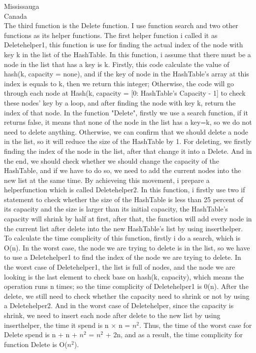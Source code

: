 \documentclass{letter}
\begin{document}
\begin{letter}{Mississauga \\ Canada}
\\The third function is the Delete function. I use function search and two other functions as its helper functions. The first helper function i called it as Deletehelper1, this function is use for finding the actual index of the node with key k in the list of the HashTable. In this function, i assume that there must be a node in the list that has a key is k. Firstly, this code calculate the value of hash(k, capacity = none), and if the key of node in the HashTable's array at this index is equals to k, then we return this integer; Otherwise, the code will go through each node at Hash(k, capacity = [0: HashTable's Capacity - 1] to check these nodes' key by a loop, and after finding the node with key k, return the index of that node. In the function "Delete", firstly we use a search function, if it returns false, it means that none of the node in the list has a key=k, so we do not need to delete anything. Otherwise, we can confirm that we should delete a node in the list, so it will reduce the size of the HashTable by 1. For deleting, we firstly finding the index of the node in the list, after that change it into a Delete. And in the end, we should check whether we should change the capacity of the HashTable, and if we have to do so, we need to add the current nodes into the new list at the same time. By achieveing this movement, i prepare a helperfunction which is called Deletehelper2. In this function, i firstly use two if statement to check whether the size of the HashTable is less than 25 percent of its capacity and the size is larger than its initial capacity, the HashTable's capacity will shrink by half at first, after that, the function will add every node in the current list after delete into the new HashTable's list by using inserthelper. To calculate the time complicity of this function, firstly i do a search, which is O(n). In the worst case, the node we are trying to delete is in the list, so we have to use a Deletehelper1 to find the index of the node we are trying to delete. In the worst case of Deletehelper1, the list is full of nodes, and the node we are looking is the last element to check base on hash(k, capacity), which means the operation runs n times; so the time complicity of Deletehelper1 is 0(n). After the delete, we still need to check whether the capacity need to shrink or not by using a Deletehelper2. And in the worst case of Deletehelper, since the capacity is shrink, we need to insert each node after delete to the new list by using inserthelper, the time it spend is n $\times$ n = $n^2$. Thus, the time of the worst case for Delete spend is n + n + $n^2$ = $n^2$ + 2n, and as a result, the time complicity for function Delete is O($n^2$).

\end{letter}
\end{document}
